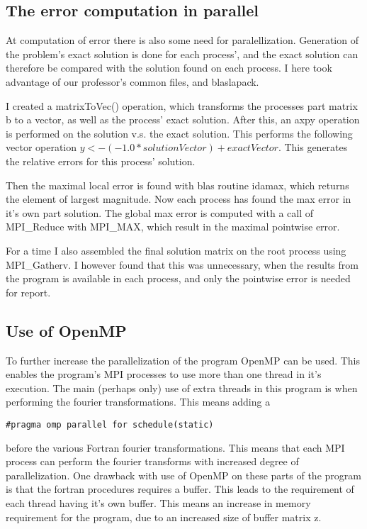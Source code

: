 \subsection{The error computation in parallel}
At computation of error there is also some need for paralellization. Generation of the problem's exact solution is done for each process', and the exact solution can therefore be compared with the solution found on each process. I here took advantage of our professor's common files, and blaslapack. 

I created a matrixToVec() operation, which transforms the processes part matrix b to a vector, as well as the process' exact solution. After this, an axpy operation is performed on the solution v.s. the exact solution. This performs the following vector operation $y <- (-1.0*solutionVector) + exactVector$. This generates the relative errors for this process' solution. 

Then the maximal local error is found with blas routine idamax, which returns the element of largest magnitude. Now each process has found the max error in it's own part solution. The global max error is computed with a call of MPI\_Reduce with MPI\_MAX, which result in the maximal pointwise error.

For a time I also assembled the final solution matrix on the root process using MPI\_Gatherv. I however found that this was unnecessary, when the results from the program is available in each process, and only the pointwise error is needed for report. 

\subsection{Use of OpenMP}
To further increase the parallelization of the program OpenMP can be used. This enables the program's MPI processes to use more than one thread in it's execution. 
The main (perhaps only) use of extra threads in this program is when performing the fourier transformations. This means adding a 
\begin{lstlisting}
#pragma omp parallel for schedule(static)
\end{lstlisting}
before the various Fortran fourier transformations. This means that each MPI process can perform the fourier transforms with increased degree of parallelization. One drawback with use of OpenMP on these parts of the program is that the fortran procedures requires a buffer. This leads to the requirement of each thread having it's own buffer. This means an increase in memory requirement for the program, due to an increased size of buffer matrix z.

